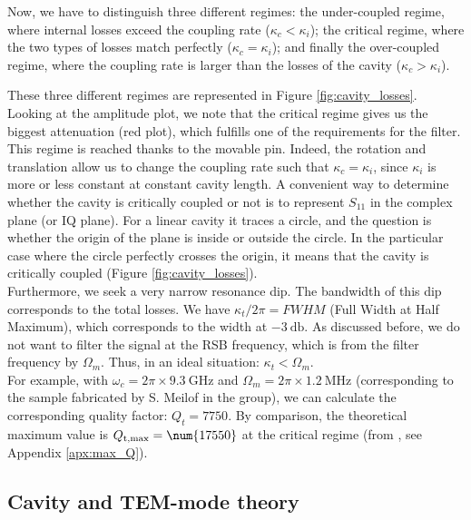 \documentclass[11pt,a4pape,longbibliography]{article}
\begin{document}
Now, we have to distinguish three different regimes: the under-coupled regime, where internal losses exceed the coupling rate ($\kappa_c < \kappa_i$); the critical regime, where the two types of losses match perfectly ($\kappa_c = \kappa_i$); and finally the over-coupled regime, where the coupling rate is larger than the losses of the cavity ($\kappa_c > \kappa_i$). 

These three different regimes are represented in Figure \ref{fig:cavity_losses}. Looking at the amplitude plot, we note that the critical regime gives us the biggest attenuation (red plot), which fulfills one of the requirements for the filter.
This regime is reached thanks to the movable pin. Indeed, the rotation and translation allow us to change the coupling rate such that $\kappa_c = \kappa_i$, since $\kappa_i$ is more or less constant at constant cavity length. A convenient way to determine whether the cavity is critically coupled or not is to represent $S_{11}$ in the complex plane (or IQ plane). For a linear cavity it traces a circle, and the question is whether the origin of the plane is inside or outside the circle. In the particular case where the circle perfectly crosses the origin, it means that the cavity is critically coupled (Figure \ref{fig:cavity_losses}).\\
 
Furthermore, we seek a very narrow resonance dip. The bandwidth of this dip corresponds to the total losses. We have $\kappa_t / 2\pi = FWHM$ (Full Width at Half Maximum), which corresponds to the width at $\SI{-3}{\decibel}$. As discussed before, we do not want to filter the signal at the RSB frequency, which is from the filter frequency by $\Omega_m$. Thus, in an ideal situation: $\kappa_t  < \Omega_m$.\\
For example, with $\omega_c = 2\pi\times\SI{9.3}{\GHz}$ and $\Omega_m=2\pi\times\SI{1.2}{\MHz}$ (corresponding to the sample fabricated by S. Meilof in the group), we can calculate the corresponding quality factor: $Q_t=\num{7750}$. By comparison, the theoretical maximum value is $Q_{\rm{t, max}} = \num{17550}$ at the critical regime (from \textcite{pozar_microwave_2012}, see Appendix \ref{apx:max_Q}).

\subsection{Cavity and TEM-mode theory}
\label{sec:cavity_theory}
\end{document}
